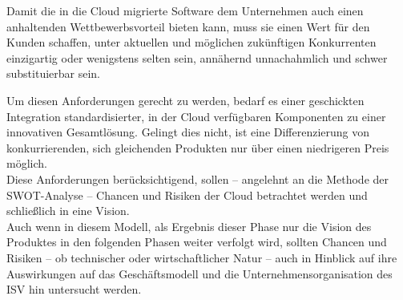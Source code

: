 Damit die in die Cloud migrierte Software dem Unternehmen auch einen anhaltenden 
Wettbewerbsvorteil bieten kann, muss sie einen Wert für den Kunden schaffen, 
unter aktuellen und möglichen zukünftigen Konkurrenten einzigartig oder 
wenigstens selten sein, annähernd unnachahmlich und schwer substituierbar sein.

Um diesen Anforderungen gerecht zu werden, bedarf es einer geschickten 
Integration standardisierter, in der Cloud verfügbaren Komponenten zu einer 
innovativen Gesamtlösung. Gelingt dies nicht, ist eine Differenzierung von 
konkurrierenden, sich gleichenden Produkten nur über einen niedrigeren Preis 
möglich.  \\

Diese Anforderungen berücksichtigend, sollen -- angelehnt an die Methode der 
SWOT-Analyse  -- Chancen und Risiken der 
Cloud betrachtet werden und schließlich in eine Vision. \\

Auch wenn in diesem Modell, als Ergebnis dieser Phase nur die Vision des 
Produktes in den folgenden Phasen weiter verfolgt wird, sollten Chancen und 
Risiken -- ob technischer oder wirtschaftlicher Natur -- auch in Hinblick auf 
ihre Auswirkungen auf das Geschäftsmodell und die 
Unternehmensorganisation des ISV hin untersucht werden. \\

